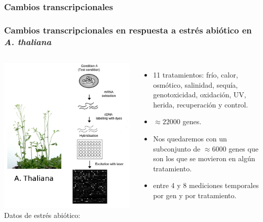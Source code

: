 \documentclass[serif,9pt, t]{beamer}
\newcommand\Fontvi{\fontsize{7}{7.2}\selectfont}
\begin{document}
\subsubsection*{Cambios transcripcionales}
\begin{frame}\frametitle{Cambios transcripcionales en respuesta a estrés abiótico en \textit{A. thaliana}} 
	\begin{columns}[T]
			\includegraphics[width=1\textwidth]{micromatriz_y_arabidopsis}
			\bigskip
			\Large 
			Datos de estrés abiótico:
			\medskip
			\Fontvi
			\begin{itemize}
				\item 11 tratamientos: frío, calor, osmótico, salinidad, sequía, genotoxicidad, oxidación, UV, herida, recuperación y control.
				\item $\approx 22000$ genes.
				\item Nos quedaremos con un subconjunto de $\approx 6000$ genes que son los que se movieron en algún tratamiento.
				\item entre 4 y 8 mediciones temporales por gen y por tratamiento.
			\end{itemize}			

\end{columns}
\end{frame}
\end{document}
